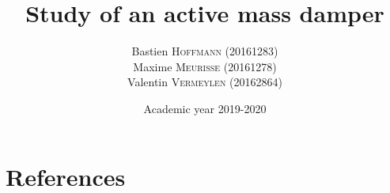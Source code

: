 \documentclass[a4paper, 12pt]{article}
\title{Study of an active mass damper}
\author{
    Bastien \textsc{Hoffmann} (20161283)\\
    Maxime \textsc{Meurisse} (20161278)\\
    Valentin \textsc{Vermeylen} (20162864)\\
}
\date{Academic year 2019-2020}
\begin{document}
    
    
    \romantableofcontents
    
    
    
    
    
    
    
    
    
    
    
    \newpage
    \section{References}
    \nocite{*}
    \printbibliography
\end{document}
